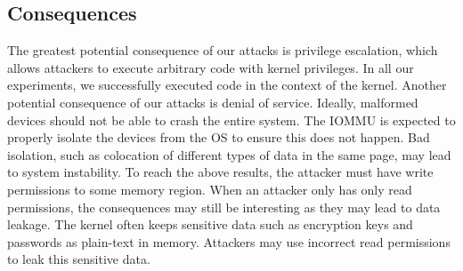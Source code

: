 \subsection{Consequences}
The greatest potential consequence of our attacks is privilege escalation, which allows
attackers to execute arbitrary code with kernel privileges. In all our experiments, we
successfully executed code in the context of the kernel. Another potential consequence
of our attacks is denial of service. Ideally, malformed devices should not be able to
crash the entire system. The IOMMU is expected to properly isolate the devices from
the OS to ensure this does not happen. Bad isolation, such as colocation of different
types of data in the same page, may lead to system instability.
To reach the above results, the attacker must have write permissions to some memory
region. When an attacker only has only read permissions, the consequences may still be
interesting as they may lead to data leakage. The kernel often keeps sensitive data such
as encryption keys and passwords as plain-text in memory. Attackers may use incorrect
read permissions to leak this sensitive data.